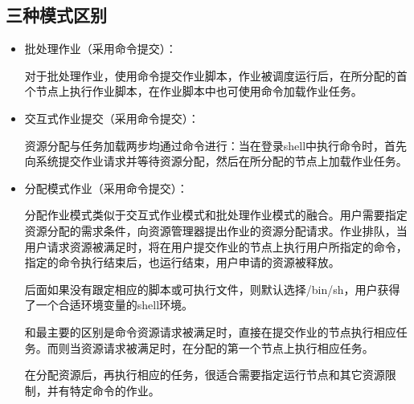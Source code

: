 \subsection{三种模式区别}
\begin{itemize}
	\item 批处理作业（采用命令提交）：

对于批处理作业，使用命令提交作业脚本，作业被调度运行后，在所分配的首个节点上执行作业脚本，在作业脚本中也可使用命令加载作业任务。
	\item 交互式作业提交（采用命令提交）：

资源分配与任务加载两步均通过命令进行：当在登录shell中执行命令时，首先向系统提交作业请求并等待资源分配，然后在所分配的节点上加载作业任务。
	\item 分配模式作业（采用命令提交）：

分配作业模式类似于交互式作业模式和批处理作业模式的融合。用户需要指定资源分配的需求条件，向资源管理器提出作业的资源分配请求。作业排队，当用户请求资源被满足时，将在用户提交作业的节点上执行用户所指定的命令，指定的命令执行结束后，也运行结束，用户申请的资源被释放。

后面如果没有跟定相应的脚本或可执行文件，则默认选择/bin/sh，用户获得了一个合适环境变量的shell环境。

和最主要的区别是命令资源请求被满足时，直接在提交作业的节点执行相应任务。而则当资源请求被满足时，在分配的第一个节点上执行相应任务。

在分配资源后，再执行相应的任务，很适合需要指定运行节点和其它资源限制，并有特定命令的作业。
\end{itemize}

